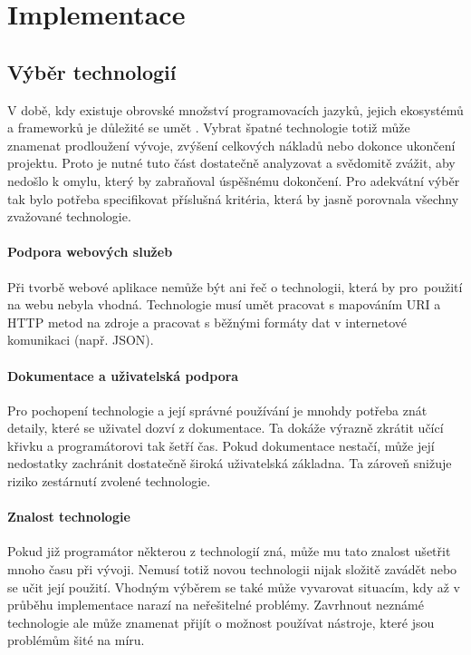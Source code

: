 \chapter{Implementace}

\section{Výběr technologií}

V době, kdy existuje obrovské množství programovacích jazyků, jejich ekosystémů a frameworků je důležité se umět . 
Vybrat špatné technologie totiž může znamenat prodloužení vývoje, zvýšení celkových nákladů nebo dokonce ukončení projektu.
Proto je nutné tuto část dostatečně analyzovat a svědomitě zvážit, aby nedošlo k omylu, který by zabraňoval úspěšnému dokončení.
Pro adekvátní výběr tak bylo potřeba specifikovat příslušná kritéria, která by jasně porovnala všechny zvažované technologie.

\subsubsection*{Podpora webových služeb}
Při tvorbě webové aplikace nemůže být ani řeč o technologii, která by pro~použití na webu nebyla vhodná. Technologie musí
umět pracovat s mapováním URI a HTTP metod na zdroje a pracovat s běžnými formáty dat v internetové komunikaci (např. JSON).

\subsubsection*{Dokumentace a uživatelská podpora}
Pro pochopení technologie a její správné používání je mnohdy potřeba znát detaily, které se uživatel dozví z dokumentace.
Ta dokáže výrazně zkrátit učící křivku a programátorovi tak šetří čas. Pokud dokumentace nestačí, může její
nedostatky zachránit dostatečně široká uživatelská základna. Ta zároveň snižuje riziko zestárnutí zvolené technologie.

\subsubsection*{Znalost technologie}
Pokud již programátor některou z technologií zná, může mu tato znalost ušetřit mnoho času při vývoji. Nemusí totiž novou technologii
nijak složitě zavádět nebo se učit její použití. Vhodným výběrem se také může vyvarovat situacím, kdy až v průběhu implementace narazí
na neřešitelné problémy. Zavrhnout neznámé technologie ale může znamenat přijít o možnost používat nástroje, které jsou problémům šité na míru. 

